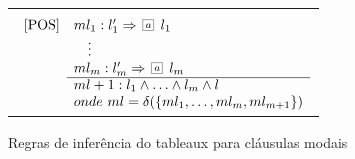 \begin{figure}[!tbh]
    \centering
    {\footnotesize
        \begin{tabular}{|c|}
            \hline
            \\
                $
                \begin{array}{cll}
                    \mbox{[POS]} &ml_1: l_1 ' \then \nec{a}~ l_1 \\ 
                                  &\ ~\ \vdots \\
                                  &ml_m: l_m ' \then \nec{a}~ l_m\\ \cline{2-2}
                                  & ml+1: l_1 \wedge \ldots \wedge l_m \wedge l \\
                                  & onde\ ml = \delta(\{ml_1,\ldots, ml_m,
                ml_{m+1}\})
                \end{array}
                $
            \\
            \hline
    \end{tabular}}
            \caption{Regras de inferência do tableaux para cláusulas modais}
            \label{tableaux}
        \end{figure}


